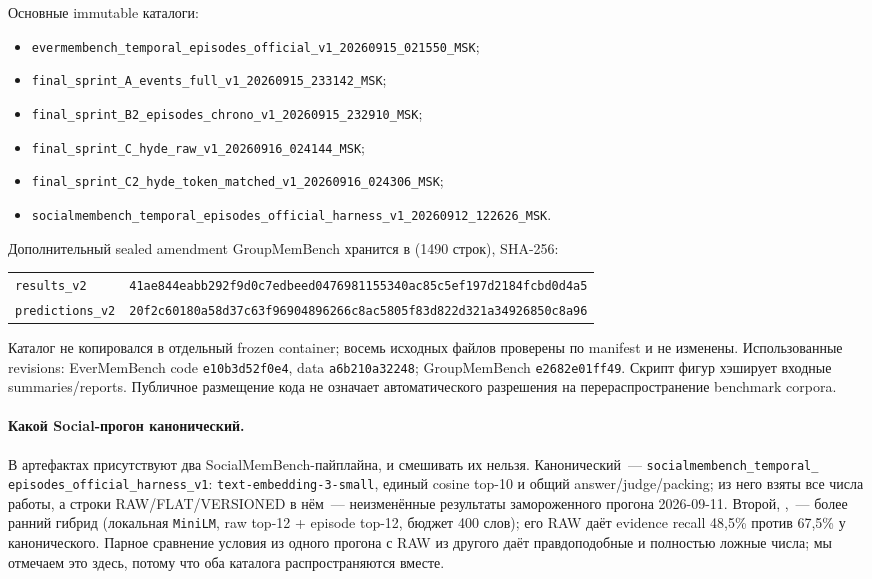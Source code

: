 \documentclass[11pt,a4paper]{article}
\newcommand{\raw}{RAW}
\begin{document}
Основные immutable каталоги:
\begin{itemize}
\item \texttt{evermembench\_temporal\_episodes\_official\_v1\_20260915\_021550\_MSK};
\item \texttt{final\_sprint\_A\_events\_full\_v1\_20260915\_233142\_MSK};
\item \texttt{final\_sprint\_B2\_episodes\_chrono\_v1\_20260915\_232910\_MSK};
\item \texttt{final\_sprint\_C\_hyde\_raw\_v1\_20260916\_024144\_MSK};
\item \texttt{final\_sprint\_C2\_hyde\_token\_matched\_v1\_20260916\_024306\_MSK};
\item \texttt{socialmembench\_temporal\_episodes\_official\_harness\_v1\_20260912\_122626\_MSK}.
\end{itemize}
Дополнительный sealed amendment GroupMemBench хранится в
 (1490 строк), SHA-256:
\begin{center}\small
\begin{tabular}{@{}ll@{}}
\texttt{results\_v2} & \texttt{41ae844eabb292f9d0c7edbeed0476981155340ac85c5ef197d2184fcbd0d4a5}\\
\texttt{predictions\_v2} & \texttt{20f2c60180a58d37c63f96904896266c8ac5805f83d822d321a34926850c8a96}
\end{tabular}
\end{center}
Каталог не копировался в отдельный frozen container; восемь исходных файлов
проверены по manifest и не изменены.
Использованные revisions: EverMemBench code \texttt{e10b3d52f0e4}, data
\texttt{a6b210a32248}; GroupMemBench \texttt{e2682e01ff49}. Скрипт фигур
хэширует входные summaries/reports. Публичное размещение кода не означает
автоматического разрешения на перераспространение benchmark corpora.

\paragraph{Какой Social-прогон канонический.}
В артефактах присутствуют два SocialMemBench-пайплайна, и смешивать их нельзя.
Канонический~--- \texttt{socialmembench\_temporal\_}\allowbreak
\texttt{episodes\_official\_harness\_v1}:
\texttt{text-embedding-3-small}, единый cosine top-10 и общий
answer/judge/packing; из него взяты все числа работы, а строки
RAW/FLAT/VERSIONED в нём~--- неизменённые результаты замороженного прогона
2026-09-11. Второй, ,~--- более
ранний гибрид (локальная \texttt{MiniLM}, raw top-12 + episode top-12, бюджет
400 слов); его \raw{} даёт evidence recall 48,5\% против 67,5\% у канонического.
Парное сравнение условия из одного прогона с \raw{} из другого даёт
правдоподобные и полностью ложные числа; мы отмечаем это здесь, потому что оба
каталога распространяются вместе.
\end{document}
